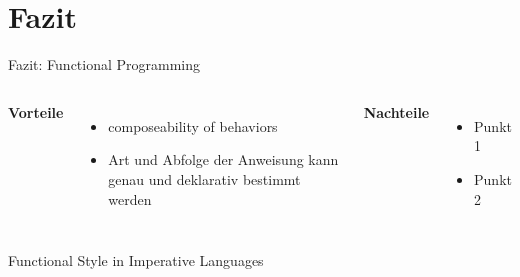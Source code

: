 \documentclass[compress]{beamer}
\begin{document}
\section{Fazit}
  \begin{frame}{Fazit: Functional Programming}
    \begin{columns}[c]
      \textbf{Vorteile}
      \begin{itemize}
        \item composeability of behaviors
        \item Art und Abfolge der Anweisung kann genau und deklarativ bestimmt werden
      \end{itemize}
      \textbf{Nachteile}
      \begin{itemize}
        \item Punkt 1
        \item Punkt 2
      \end{itemize}
    \end{columns}
  \end{frame}
  
  \begin{frame}{Functional Style in Imperative Languages}
  \end{frame}
\end{document}
